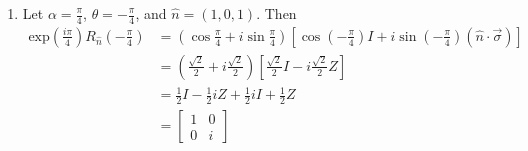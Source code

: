 \documentclass[a4paper,12pt]{article}
\begin{document}
\begin{enumerate}
\begin{enumerate}
            \item Let $\alpha = \frac{\pi}{4}$, $\theta = -\frac{\pi}{4}$, and $\hat{n} = (1, 0, 1)$. Then
                \begin{align*}
                    \mbox{exp} \left( \frac{i\pi}{4} \right) R_{\hat{n}} \left( -\frac{\pi}{4} \right) &= \left( \cos{\frac{\pi}{4}} + i\sin{\frac{\pi}{4}} \right) \left[ \cos{\left( -\frac{\pi}{4} \right)} I + i\sin{\left( -\frac{\pi}{4} \right)} (\hat{n} \cdot \vec{\sigma}) \right] \\
                    &= \left( \frac{\sqrt{2}}{2} + i\frac{\sqrt{2}}{2} \right) \left[\frac{\sqrt{2}}{2}I - i\frac{\sqrt{2}}{2} Z \right] \\
                    &= \frac{1}{2}I - \frac{1}{2}iZ + \frac{1}{2}iI + \frac{1}{2}Z \\
                    &=
                    \left[ \begin{array}{cc}
                        1 & 0 \\
                        0 & i
                    \end{array} \right]
                \end{align*}
            \fi
        \end{enumerate}


\end{enumerate}
\end{document}
